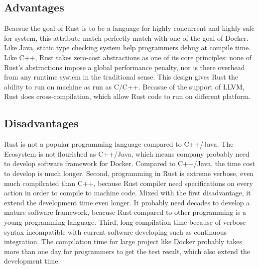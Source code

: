 \documentclass[10pt, a4paper]{IEEEtran}
\begin{document}
    \subsection*{Advantages}
    Beacsue the goal of Rust is to be a language for highly concurrent and highly safe for system,\cite{infoq} this attribute match perfectly match with one of the goal of Docker. Like Java, static type checking system help programmers debug at compile time. Like C++, Rust takes zero-cost abstractions as one of its core principles: none of Rust’s abstractions impose a global performance penalty, nor is there overhead from any runtime system in the traditional sense.\cite{Rust_questions} This design gives Rust the ability to run on machine as run as C/C++. Becasue of the support of LLVM, Rust does cross-compilation, which allow Rust code to run on different platform.
    \subsection*{Disadvantages}
    Rust is not a popular programming language compared to C++/Java. The Ecosystem is not flourished as C++/Java, which means company probably need to develop software framework for Docker. Compared to C++/Java, the time cost to develop is much longer. Second, programming in Rust is extreme verbose, even much compilcated than C++, because Rust compiler need specifications on every action in order to compile to machine code. Mixed with the first disadvantage, it extend the development time even longer. It probably need decades to develop a mature software framework, beacuse Rust compared to other programming is a young programming language. Third, long compilation time because of verbose syntax incompatible with current software developing such as continuous integration. The compilation time for large project like Docker probably takes more than one day for programmers to get the test result, which also extend the development time.
 
    
    
\end{document}
